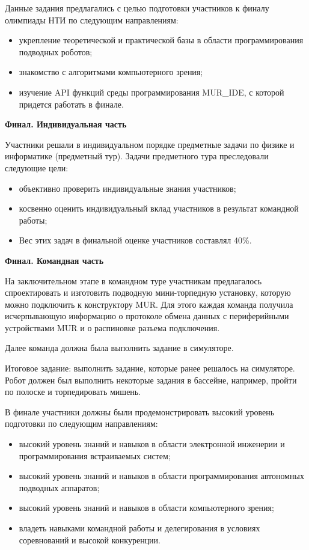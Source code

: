 Данные задания предлагались с целью подготовки участников к финалу олимпиады НТИ по следующим направлениям:
\begin{itemize}
    \item укрепление теоретической и практической базы в области программирования подводных роботов;
    \item знакомство с алгоритмами компьютерного зрения;
    \item изучение API функций среды программирования MUR\_IDE, с которой придется работать в финале.
\end{itemize}

\textbf{Финал. Индивидуальная часть}

Участники решали в индивидуальном порядке предметные задачи по физике и информатике (предметный тур). Задачи предметного тура преследовали следующие цели:
\begin{itemize}
    \item объективно проверить индивидуальные знания участников;
    \item косвенно оценить индивидуальный вклад участников в результат командной работы;
    \item Вес этих задач в финальной оценке участников составлял 40\%.
\end{itemize}

\textbf{Финал. Командная часть}

На заключительном этапе в командном туре участникам предлагалось спроектировать и изготовить подводную мини-торпедную установку, которую можно подключить к конструктору MUR. Для этого каждая команда получила исчерпывающую информацию о протоколе обмена данных с периферийными устройствами MUR и о распиновке разъема подключения. 

Далее команда должна была выполнить задание в симуляторе.

Итоговое задание: выполнить задание, которые ранее решалось на симуляторе. Робот должен был выполнить некоторые задания в бассейне, например, пройти по полоске и торпедировать мишень.

В финале участники должны были продемонстрировать высокий уровень подготовки по следующим направлениям:
\begin{itemize}
    \item высокий уровень знаний и навыков в области электронной инженерии и программирования встраиваемых систем;
    \item высокий уровень знаний и навыков в области программирования автономных подводных аппаратов;
    \item высокий уровень знаний и навыков в области компьютерного зрения;
    \item владеть навыками командной работы и делегирования в условиях соревнований и высокой конкуренции.
\end{itemize}